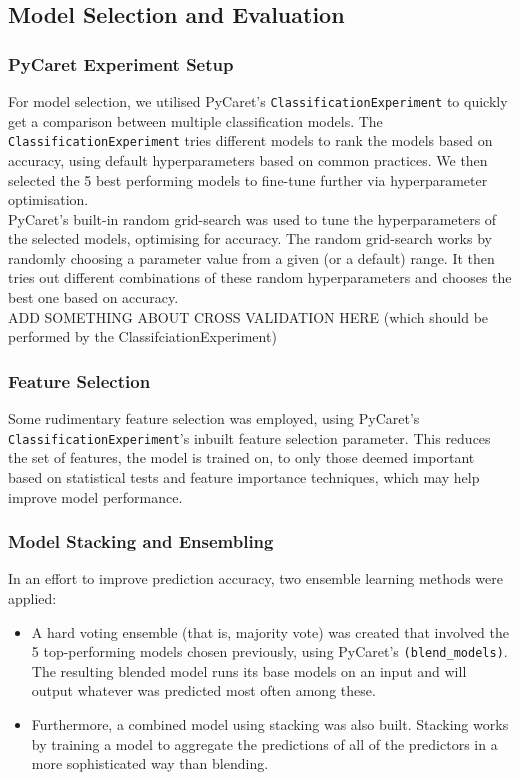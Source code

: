 \documentclass[a4paper,12pt]{article}
\begin{document}
\subsection{Model Selection and Evaluation}
\subsubsection{PyCaret Experiment Setup}
For model selection, we utilised PyCaret's \texttt{ClassificationExperiment} to quickly get a 
comparison between multiple classification models. The \texttt{ClassificationExperiment} tries 
different models to rank the models based on accuracy, using default hyperparameters based on common practices. 
We then selected the 5 best performing models to fine-tune further via hyperparameter optimisation. 
\\
PyCaret’s built-in random grid-search was used to tune the hyperparameters of the selected models, 
optimising for accuracy. The random grid-search works by 
randomly choosing a parameter value from a given (or a default) range. It then tries out different combinations
of these random hyperparameters and chooses the best one based on accuracy.
\\
ADD SOMETHING ABOUT CROSS VALIDATION HERE (which should be performed by the ClassifciationExperiment)


\subsubsection{Feature Selection}
Some rudimentary feature selection was employed, using PyCaret's \texttt{ClassificationExperiment}'s inbuilt
feature selection parameter. This reduces the set of features, the model is trained on, to only those deemed 
important based on statistical tests and feature importance techniques, which may help improve model 
performance.

\subsubsection{Model Stacking and Ensembling}
In an effort to improve prediction accuracy, two ensemble learning methods were applied:
\begin{itemize}
    \item A hard voting ensemble (that is, majority vote) was created that involved 
    the 5 top-performing models chosen previously, using PyCaret's \texttt{(blend\_models)}. 
    The resulting blended model runs its base models on an input
    and will output whatever was predicted most often among these.
    \item Furthermore, a combined model using stacking was also built. 
    Stacking works by training a model to aggregate the predictions of all of the predictors in a more
    sophisticated way than blending.
\end{itemize} 
\end{document}
